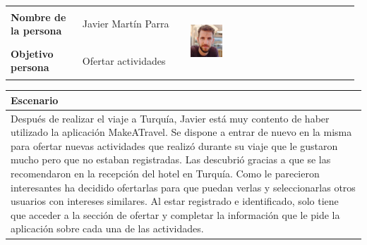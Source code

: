 \documentclass[11pt]{article}
\begin{document}
\begin{table}[H]
  \centering
  \begin{tabular}{p{0.2\linewidth}|p{0.3\linewidth}p{0.475\linewidth}}
    \toprule
    \textbf{Nombre de la persona} & Javier Martín Parra &\multirow{2}{*}{\begin{minipage}{1.\textwidth}\includegraphics[width=0.2\textwidth, height=25mm]{Javier}\end{minipage}}\\
    \textbf{Objetivo persona} & Ofertar actividades & \\
    \bottomrule
  \end{tabular}

\begin{tabular}{p{1.028\linewidth}}
  \textbf{Escenario}\\
  \midrule
  Después de realizar el viaje a Turquía, Javier está muy contento de haber utilizado la aplicación MakeATravel. Se dispone a entrar de nuevo en la misma para ofertar nuevas actividades que realizó durante su viaje que le gustaron mucho pero que no estaban registradas. Las descubrió gracias a que se las recomendaron en la recepción del hotel en Turquía. Como le parecieron interesantes ha decidido ofertarlas para que puedan verlas y seleccionarlas otros usuarios con intereses similares. Al estar registrado e identificado, solo tiene que acceder a la sección de ofertar y completar la información que le pide la aplicación sobre cada una de las actividades.
\end{tabular}
\end{table}
\end{document}
